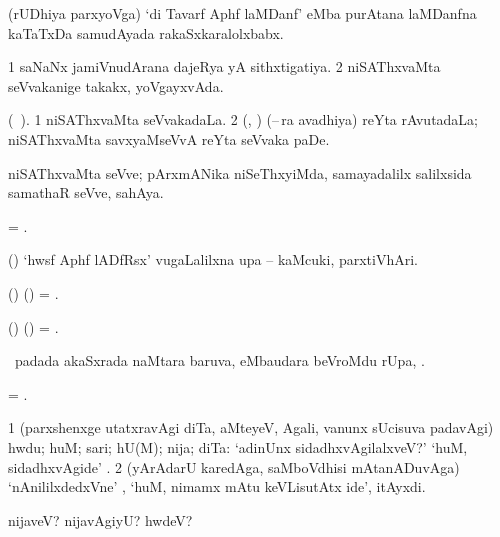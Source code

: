  (rUDhiya parxyoVga) `di  Tavarf Aphf laMDanf' eMba purAtana laMDanfna kaTaTxDa samudAyada rakaSxkaralolxbabx.
\eanum
\numie
\enum
\emng
\eentry

\bentry
{} 
\gl{\gu} 
\bmng
\bnum
\num{1} saNaNx jamiVnudArana dajeRya yA sithxtigatiya. 
\num{2} niSAThxvaMta seVvakanige takakx, yoVgayxvAda.
\enum
\emng 
\eentry

\bentry
{} 
\gl{\nA} 
\bmng
(\bava\ ).
\bnum
\num{1} niSAThxvaMta seVvakadaLa. 
\num{2} (\birx, \ca) (--\,ra avadhiya) reYta rAvutadaLa; niSAThxvaMta  savxyaMseVvA reYta seVvaka paDe.
\enum
\emng
\eentry

\bentry
{}
\gl{\nA} 
\bmng
niSAThxvaMta seVve; pArxmANika niSeThxyiMda, samayadalilx salilxsida samathaR seVve, sahAya.
\emng
\eentry

\bentry
{}
\gl{\nA} 
\bmng
= .
\emng
\eentry

\bentry
{}
\gl{\nA} 
\bmng
(\birx) `hwsf Aphf lADfRsx'  \mo vugaLalilxna upa -- kaMcuki, parxtiVhAri.
\emng
\eentry

\bentry
{} 
\gl{\kirxvi} 
\bmng
(\ame) (\AmA) = .
\emng
\eentry

\bentry
{} 
\gl{\nA} 
\bmng
(\ame) (\AmA) = .
\emng
\eentry

\bentry
{} 
\gl{\uparx} 
\bmng
\sA\ padada  akaSxrada naMtara baruva,  eMbaudara beVroMdu rUpa, \udA. 
\emng
\eentry

\bentry
{}
\gl{\nA} 
\bmng
= .
\emng 
\eentry

\bentry
{} 
\gl{\kirxvi} 
\bmng
\bnum
\num{1}  (parxshenxge utatxravAgi diTa, aMteyeV, Agali, \mo vanunx sUcisuva padavAgi) hwdu; huM; sari; hU(M); nija; diTa:  `adinUnx sidadhxvAgilalxveV?' `huM, sidadhxvAgide' . 
\num{2} (yArAdarU karedAga, saMboVdhisi mAtanADuvAga) `nAnililxdedxVne' , `huM, nimamx mAtu keVLisutAtx ide', itAyxdi.   
\enum
\emng

\noindent                         
\gl{\pagu}
\bmng
\bnum
{}  
\banum
{} nijaveV? nijavAgiyU? hwdeV? 

